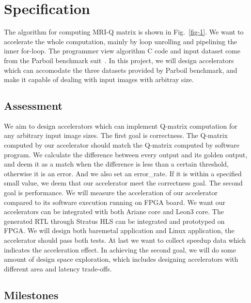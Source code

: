 \documentclass{sig-alternate}
\begin{document}
\section{Specification}
The algorithm for computing MRI-Q matrix is shown in Fig.~\ref{fig-1}. We want to accelerate the whole computation, mainly by loop unrolling and pipelining the inner for-loop. The programmer view algorithm C code and input dataset come from the Parboil benchmark suit~\cite{Rub1}. In this project, we will design accelerators which can accomodate the three datasets provided by Parboil benchmark, and make it capable of dealing with input images with arbitray size.


\subsection{Assessment}
We aim to design accelerators which can implement Q-matrix computation for any arbitrary input image sizes. The first goal is correctness. The Q-matrix computed by our accelerator should match the Q-matrix computed by software program. We calculate the difference between every output and its golden output, and deem it as a match when the difference is less than a certain threshold, otherwise it is an error. And we also set an error\_rate. If it is within a specified small value, we deem that our accelerator meet the correctness goal. The second goal is performance. We will measure the acceleration of our accelerator compared to its software execution running on FPGA board. We want our accelerators can be integrated with both Ariane core and Leon3 core. The generated RTL through Stratus HLS can be integrated and prototyped on FPGA. We will design both baremetal application and Linux application, the accelerator should pass both tests. At last we want to collect speedup data which indicates the acceleration effect. In achieving the second goal, we will do some amount of design space exploration, which includes designing accelerators with different area and latency trade-offs. 

\subsection{Milestones}\label{sec:arch}
\label{sec:milestones}
\end{document}
